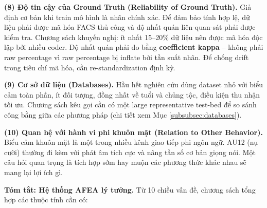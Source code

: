 \documentclass[12pt,a4paper]{article}
\let\oldtextbf\textbf
\renewcommand{\textbf}[1]{\oldtextbf{\textcolor{hcmublue}{#1}}}
\begin{document}
\textbf{(8) Độ tin cậy của Ground Truth (Reliability of Ground Truth).}
Giả định cơ bản khi train mô hình là nhãn chính xác. Để đảm bảo tính hợp lệ, dữ liệu phải được mã hóa FACS thủ công và độ nhất quán liên-quan-sát phải được kiểm tra. Chương sách khuyến nghị: ít nhất 15--20\% dữ liệu nên được mã hóa độc lập bởi nhiều coder. Độ nhất quán phải đo bằng \textbf{coefficient kappa} -- không phải raw percentage vì raw percentage bị inflate bởi tần suất nhãn. Để chống drift trong tiêu chí mã hóa, cần re-standardization định kỳ.

\textbf{(9) Cơ sở dữ liệu (Databases).}
Hầu hết nghiên cứu dùng dataset nhỏ với biểu cảm toàn phần, ít đối tượng, đồng nhất về tuổi và chủng tộc, điều kiện thu nhận tối ưu. Chương sách kêu gọi cần có một large representative test-bed để so sánh công bằng giữa các phương pháp (chi tiết xem Mục \ref{subsubsec:databases}).

\textbf{(10) Quan hệ với hành vi phi khuôn mặt (Relation to Other Behavior).}
Biểu cảm khuôn mặt là một trong nhiều kênh giao tiếp phi ngôn ngữ. AU12 (nụ cười) thường đi kèm với phát âm tích cực và nâng tần số cơ bản giọng nói. Một câu hỏi quan trọng là tích hợp sớm hay muộn các phương thức khác nhau sẽ mang lại lợi ích gì.

\textbf{Tóm tắt: Hệ thống AFEA lý tưởng.}
Từ 10 chiều vấn đề, chương sách tổng hợp các thuộc tính cần có:
\end{document}
